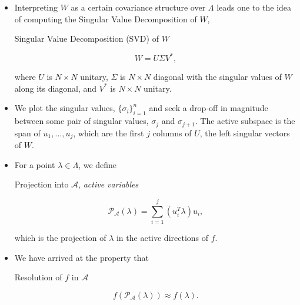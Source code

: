 \documentclass[11pt]{beamer}
\newcommand{\A}{\mathcal{A}}
\begin{document}
\begin{frame}

\begin{itemize}



\item Interpreting $W$ as a certain covariance structure over $\Lambda$ leads one to the idea of computing the Singular Value Decomposition of $W$,

\begin{block}{Singular Value Decomposition (SVD) of $W$}

\begin{equation} \label{eq:5}
W=U\Sigma V^*,
\end{equation} 


\noindent where $U$ is $N \times N$ unitary, $\Sigma$ is $N \times N$ diagonal with the singular values of $W$ along its diagonal, and $V^*$ is $N \times N$ unitary.

\end{block}

\item We plot the singular values, $\{\sigma_i\}_{i=1}^n$ and seek a drop-off in magnitude between some pair of singular values, $\sigma_{j}$ and $\sigma_{j+1}$. The active subspace is the span of $u_1,\ldots,u_{j}$, which are the first $j$ columns of $U$, the left singular vectors of $W$. 


\end{itemize}

\end{frame}

\begin{frame}

\begin{itemize}

	\item For a point $\lambda \in \Lambda$, we define

\begin{block}{Projection into $\mathcal{A}$, \textit{active variables}}

\begin{equation} \label{eq:6}
  \mathcal{P}_\A(\lambda)=\sum_{i=1}^{j}\left( u_i^T \lambda\right)u_i, 
\end{equation}

\noindent which is the projection of $\lambda$ in the active directions of $f$.

\end{block}

\item We have arrived at the property that 

\begin{block}{Resolution of $f$ in $\mathcal{A}$}

\begin{equation} \label{eq:7}
f\left(\mathcal{P}_\A(\lambda)\right) \approx f(\lambda).
\end{equation}

\end{block}

\end{itemize}



\end{frame}
\end{document}

